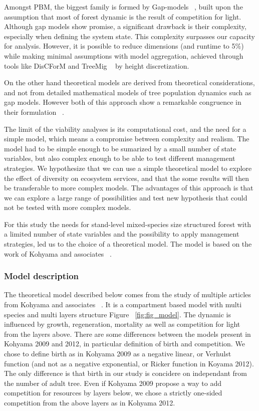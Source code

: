 \documentclass{article}
\begin{document}
Amongst PBM, the biggest family is formed by Gap-models ~\autocite{bugmannREVIEWFORESTGAP2001}, built upon the assumption that most of forest dynamic is the result of competition for light.
Although gap models show promise, a significant drawback is their complexity, especially when defining the system state. This complexity surpasses our capacity for analysis. However, it is possible to reduce dimensions (and runtime to 5\%) while making minimal assumptions with model aggregation, achieved through tools like DisCForM and TreeMig ~\autocite{lischkeAggregationIndividualTrees1998,lischkeTreeMigForestlandscapeModel2006} by height discretization.

On the other hand theoretical models are derived from theoretical considerations, and not from detailed mathematical models of tree population dynamics such as gap models. However both of this approach show a remarkable congruence in their formulation ~\autocite{bugmannREVIEWFORESTGAP2001}.

The limit of the viability analyses is its computational cost, and the need for a simple model, which means a compromise between complexity and realism. The model had to be simple enough to be sumarized by a small number of state variables, but also complex enough to be able to test different management strategies. We hypothesize that we can use a simple theoretical model to explore the effect of diversity on ecosystem services, and that the some results will then be transferable to more complex models. The advantages of this approach is that we can explore a large range of possibilities and test new hypothesis that could not be tested with more complex models.

For this study the needs for stand-level mixed-species size structured forest with a limited number of state variables and the possibility to apply management strategies, led us to the choice of a theoretical model. The model is based on the work of Kohyama and associates ~\autocite{kohyamaStratificationTheoryPlant2009, kohyamaOnesidedCompetitionLight2012}.

\subsubsection{Model description}

The theoretical model described below comes from the study of multiple articles from Kohyama and associates ~\autocite{kohyamaStratificationTheoryPlant2009, kohyamaOnesidedCompetitionLight2012}.
It is a compartment based model with multi species and multi layers structure Figure ~\ref{fig:fig_model}. The dynamic is influenced by growth, regeneration, mortality as well as competition for light from the layers above. There are some differences between the models present in Kohyama 2009 and 2012, in particular definition of birth and competition. We chose to define birth as in Kohyama 2009 as a negative linear, or Verhulst function (and not as a negative exponential, or Ricker function in Koyama 2012). The only difference is that birth in our study is concidere on independant from the number of adult tree. Even if Kohyama 2009 propose a way to add competition for resources by layers below, we chose a strictly one-sided competition from the above layers as in Kohyama 2012.
\end{document}
